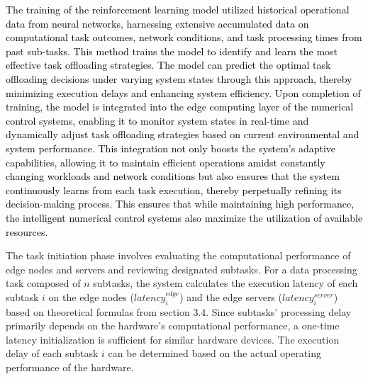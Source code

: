 \documentclass[preprint,12pt]{elsarticle}
\begin{document}
\textcolor{black}{The training of the reinforcement learning model utilized historical operational data from neural networks, harnessing extensive accumulated data on computational task outcomes, network conditions, and task processing times from past sub-tasks. This method trains the model to identify and learn the most effective task offloading strategies. The model can predict the optimal task offloading decisions under varying system states through this approach, thereby minimizing execution delays and enhancing system efficiency. Upon completion of training, the model is integrated into the edge computing layer of the numerical control systems, enabling it to monitor system states in real-time and dynamically adjust task offloading strategies based on current environmental and system performance. This integration not only boosts the system's adaptive capabilities, allowing it to maintain efficient operations amidst constantly changing workloads and network conditions but also ensures that the system continuously learns from each task execution, thereby perpetually refining its decision-making process. This ensures that while maintaining high performance, the intelligent numerical control systems also maximize the utilization of available resources.}

The task initiation phase involves evaluating the computational performance of edge nodes and servers and reviewing designated subtasks. For a data processing task composed of \(n\) subtasks, the system calculates the execution latency of each subtask \(i\) on the edge nodes (\(latency_i^{edge}\)) and the edge servers (\(latency_i^{server}\)) based on theoretical formulas from section 3.4. Since subtasks' processing delay primarily depends on the hardware's computational performance, a one-time latency initialization is sufficient for similar hardware devices. The execution delay of each subtask \(i\) can be determined based on the actual operating performance of the hardware.
\end{document}
